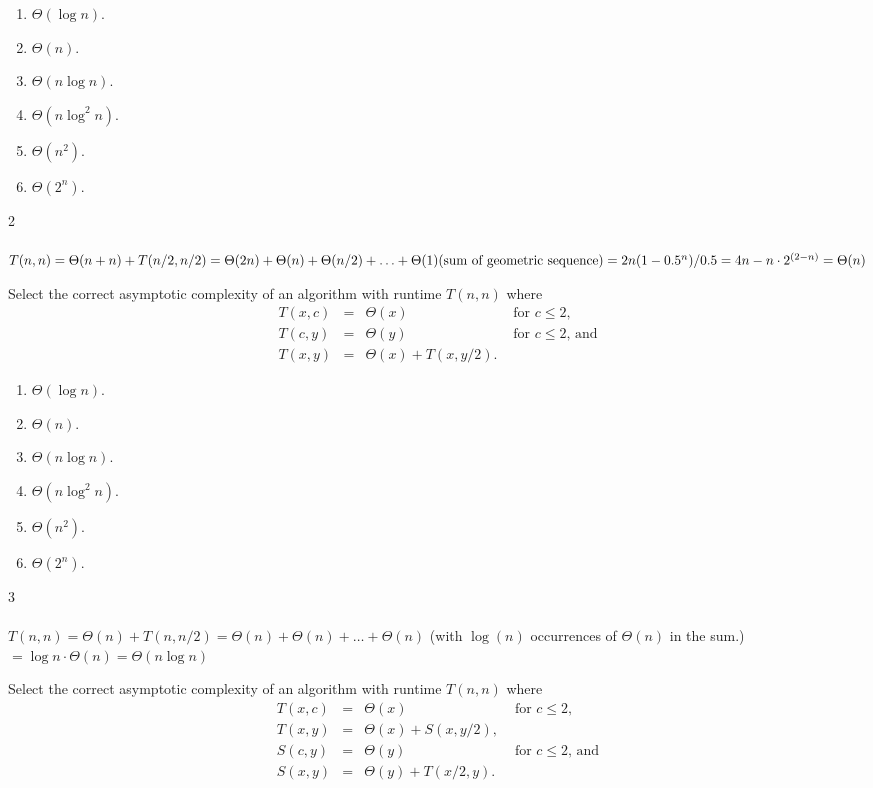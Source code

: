 \documentclass[12pt,twoside]{article}
\begin{document}
\begin{problems}
\begin{problemparts}
\begin{enumerate}
\item $\Theta(\log n)$.
\item $\Theta(n)$.
\item $\Theta(n \log n)$.
\item $\Theta(n \log^2 n)$.
\item $\Theta(n^2)$.
\item $\Theta(2^n)$.
\end{enumerate}

\ifsolution \solution{}
{\color{blue}2
\\
\\
$T(n,n)=\Theta(n+n)+T(n/2,n/2)=\Theta(2n)+\Theta(n)+\Theta(n/2)+\ldots
+\Theta(1)\\
(\text{sum of geometric sequence})=2n(1-0.5^n)/0.5=4n-n\cdot 2^{(2-n)}=\Theta(n)$}
\\
\fi

\problempart {}
Select the correct asymptotic complexity
of an algorithm with runtime $T(n, n)$
where 
$$
\begin{array}{rcll}
T(x, c) &=& \Theta(x) & \textrm{ for $c \le 2$}, \\
T(c, y) &=& \Theta(y) & \textrm{ for $c \le 2$, and} \\
T(x, y) &=& \Theta(x) + T(x, y / 2).
\end{array}
$$

\begin{enumerate}
\item $\Theta(\log n)$.
\item $\Theta(n)$.
\item $\Theta(n \log n)$.
\item $\Theta(n \log^2 n)$.
\item $\Theta(n^2)$.
\item $\Theta(2^n)$.
\end{enumerate}

\ifsolution \solution{}
{\color{blue}3
\\
\\
$T(n,n)=\Theta(n)+T(n,n/2)=\Theta(n)+\Theta(n)+\ldots+\Theta(n)$ ({with $\log (n)$ occurrences of} $\Theta(n)$ in the sum.)$=\log n \cdot\Theta(n)=\Theta(n\log n)$
\\}
\fi

\problempart {}
Select the correct asymptotic complexity
of an algorithm with runtime $T(n, n)$
where 
$$
\begin{array}{rcll}
T(x, c) &=& \Theta(x) & \textrm{ for $c \le 2$}, \\
T(x, y) &=& \Theta(x) + S(x, y / 2), \\
S(c, y) &=& \Theta(y) & \textrm{ for $c \le 2$, and} \\
S(x, y) &=& \Theta(y) + T(x / 2, y).
\end{array}
$$


\end{problemparts}
\end{problems}
\end{document}
